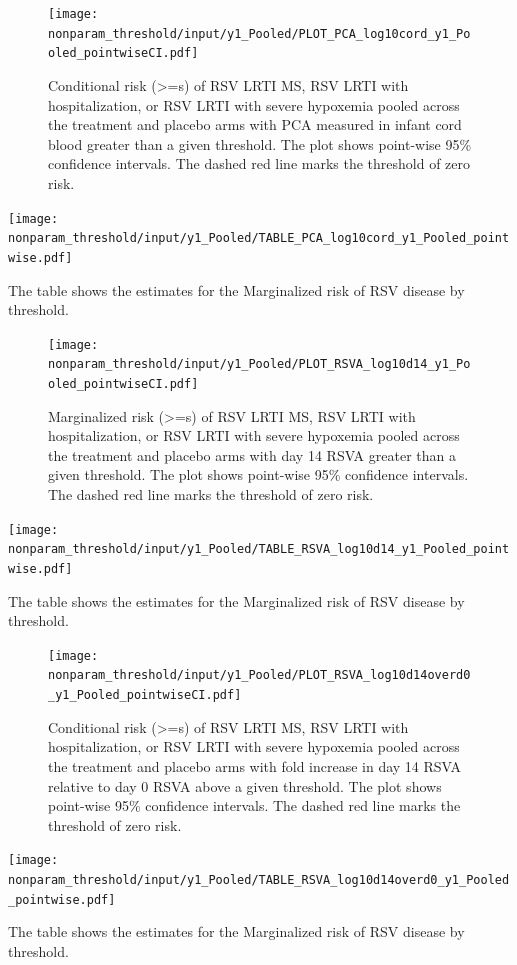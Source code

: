 \documentclass[11pt]{article}
\begin{document}
\begin{figure}[H]
\centering
\texttt{[image: nonparam\_threshold/input/y1\_Pooled/PLOT\_PCA\_log10cord\_y1\_Pooled\_pointwiseCI.pdf]}
\caption{Conditional risk (>=s) of RSV LRTI MS, RSV LRTI with hospitalization, or RSV LRTI with severe hypoxemia pooled across the treatment and placebo arms with PCA measured in infant cord blood greater than a given threshold. The plot shows point-wise 95\% confidence intervals. The dashed red line marks the threshold of zero risk.}
\end{figure}

\begin{table}[H]
\centering
\texttt{[image: nonparam\_threshold/input/y1\_Pooled/TABLE\_PCA\_log10cord\_y1\_Pooled\_pointwise.pdf]}
\caption{The table shows the  estimates for the Marginalized risk of RSV disease by threshold. }
\end{table}

\begin{figure}[H]
\centering
\texttt{[image: nonparam\_threshold/input/y1\_Pooled/PLOT\_RSVA\_log10d14\_y1\_Pooled\_pointwiseCI.pdf]}
\caption{Marginalized risk (>=s) of RSV LRTI MS, RSV LRTI with hospitalization, or RSV LRTI with severe hypoxemia pooled across the treatment and placebo arms with day 14 RSVA greater than a given threshold. The plot shows point-wise 95\% confidence intervals. The dashed red line marks the threshold of zero risk.}
\end{figure}

\begin{table}[H]
\centering
\texttt{[image: nonparam\_threshold/input/y1\_Pooled/TABLE\_RSVA\_log10d14\_y1\_Pooled\_pointwise.pdf]}
\caption{The table shows the  estimates for the Marginalized risk of RSV disease by threshold. }
\end{table}

\begin{figure}[H]
\centering
\texttt{[image: nonparam\_threshold/input/y1\_Pooled/PLOT\_RSVA\_log10d14overd0\_y1\_Pooled\_pointwiseCI.pdf]}
\caption{Conditional risk (>=s) of RSV LRTI MS, RSV LRTI with hospitalization, or RSV LRTI with severe hypoxemia pooled across the treatment and placebo arms with fold increase in day 14 RSVA relative to day 0 RSVA above a given threshold. The plot shows point-wise 95\% confidence intervals. The dashed red line marks the threshold of zero risk.}
\end{figure}

\begin{table}[H]
\centering
\texttt{[image: nonparam\_threshold/input/y1\_Pooled/TABLE\_RSVA\_log10d14overd0\_y1\_Pooled\_pointwise.pdf]}
\caption{The table shows the  estimates for the Marginalized risk of RSV disease by threshold. }
\end{table}
\end{document}
